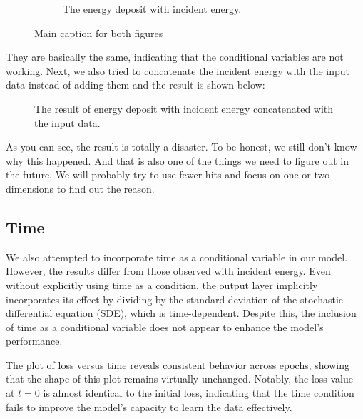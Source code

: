 \begin{figure}[htbp]
\begin{subfigure}[b]{0.45\textwidth}
        \caption{The energy deposit with incident energy.}
        \label{fig:with_incident}
    \end{subfigure}
    
    \caption{Main caption for both figures}
    \label{fig:main}
\end{figure}

They are basically the same, indicating that the conditional variables are not working. Next, we also tried to concatenate the incident energy with the input data instead of adding them and the result is shown below:

\begin{figure}[ht]
    \centering
    \caption{The result of energy deposit with incident energy concatenated with the input data.}
\end{figure}

As you can see, the result is totally a disaster. To be honest, we still don't know why this happened. And that is also one of the things we need to figure out in the future. We will probably try to use fewer hits and focus on one or two dimensions to find out the reason.






\subsection{Time}

We also attempted to incorporate time as a conditional variable in our model. However, the results differ from those observed with incident energy. Even without explicitly using time as a condition, the output layer implicitly incorporates its effect by dividing by the standard deviation of the stochastic differential equation (SDE), which is time-dependent. Despite this, the inclusion of time as a conditional variable does not appear to enhance the model's performance.

The plot of loss versus time reveals consistent behavior across epochs, showing that the shape of this plot remains virtually unchanged. Notably, the loss value at $t = 0$ is almost identical to the initial loss, indicating that the time condition fails to improve the model's capacity to learn the data effectively.


